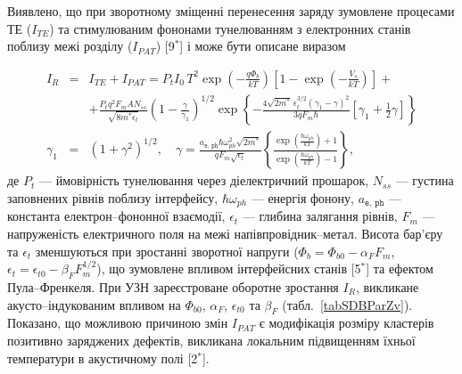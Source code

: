 Виявлено, що при зворотному зміщенні
перенесення заряду зумовлене процесами ТЕ ($I_{TE}$) та
стимулюваним фононами тунелюванням з електронних станів поблизу межі розділу ($I_{P\!AT}$)
[9$^*$]
і може бути описане виразом

\begin{eqnarray}
\label{eqIgen}
 I_R&=&I_{TE}+I_{P\!AT}=P_tI_0\,T^2\exp\left(-\frac{q\Phi_b}{kT}\right)\left[1-\exp\left(-\frac{V_s}{kT}\right)\right]+\\
 &&+\frac{P_tq^2F_mAN_{ss}}{\sqrt{8m^*\epsilon_t}}\left(1-\frac{\gamma}{\gamma_1}\right)^{1/2}\exp
    \left\{-\frac{4\sqrt{2m^*}\,\epsilon_t^{3/2}\left(\gamma_1-\gamma\right)^2}{3qF_m\hbar} \nonumber
    [\gamma_1+\frac{1}{2}\gamma]\right\}\\ \nonumber
    \gamma_1&=&(1+\gamma^2)^{1/2}, \quad
    \gamma=\frac{a_\mathtt{e,\,ph}\hbar\omega_{ph}^2\sqrt{2m^*}}{qF_m\sqrt{\epsilon_t}}
    \left\{\frac{\exp\left(\frac{\hbar\omega_{ph}}{kT}\right)+1}{\exp\left(\frac{\hbar\omega_{ph}}{kT}\right)-1}\right\},   \nonumber
\end{eqnarray}
де
$P_t$ --- ймовірність тунелювання через діелектричний прошарок,
$N_{ss}$ --- густина заповнених рівнів поблизу інтерфейсу,
$\hbar\omega_{ph}$ --- енергія фонону,
$a_\mathtt{e,\,ph}$ --- константа електрон--фононної взаємодії,
$\epsilon_t$ --- глибина залягання рівнів,
$F_m$ --- напруженість електричного поля на межі напівпровідник--метал.
Висота бар'єру та $\epsilon_t$ зменшуються при зростанні зворотної напруги
($\Phi_{b}=\Phi_{b0}-\alpha_{F} F_m$,
$\epsilon_t=\epsilon_{t0}-\beta_F F_m^{1/2}$), що зумовлене впливом інтерфейсних станів
[5$^*$] та ефектом Пула--Френкеля.
При УЗН зареєстроване оборотне зростання $I_R$, викликане
акусто--індукованим впливом на $\Phi_{b0}$, $\alpha_{F}$, $\epsilon_{t0}$ та $\beta_F$ (табл.~\ref{tabSDBParZv}).
Показано, що можливою причиною
змін $I_{P\!AT}$ є модифікація розміру кластерів позитивно заряджених дефектів, викликана
локальним підвищенням їхньої температури в акустичному полі
[2$^*$].




